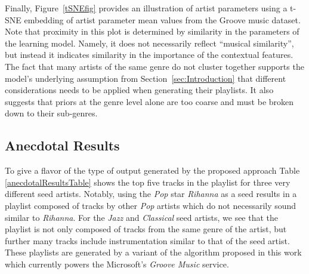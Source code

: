  
Finally, Figure~\ref{tSNEfig} provides an illustration of artist parameters using a t-SNE embedding \cite{Maaten2008} of artist parameter mean values from the Groove music dataset. 
Note that proximity in this plot is determined by similarity in the parameters of the learning model. Namely, it does not necessarily reflect ``musical similarity'', but instead it indicates similarity in the importance of the contextual features. The fact that many artists of the same genre do not cluster together supports the model's underlying assumption from Section~\ref{sec:Introduction} that different considerations needs to be applied when generating their playlists. It also suggests that priors at the genre level alone are too coarse and must be broken down to their sub-genres. 


\subsection{Anecdotal Results}


To give a flavor of the type of output generated by the proposed approach Table \ref{anecdotalResultsTable} shows the top five tracks in the playlist for three very different seed artists. Notably, using the \textit{Pop} star \textit{Rihanna} as a seed results in a playlist composed of tracks by other \textit{Pop} artists which do not necessarily sound similar to \textit{Rihanna}. For the \textit{Jazz} and \textit{Classical} seed artists, we see that the playlist is not only composed of tracks from the same genre of the artist, but further many tracks include instrumentation similar to that of the seed artist. These playlists are generated by a variant of the algorithm proposed in this work which currently powers the Microsoft's \textit{Groove Music} service.



